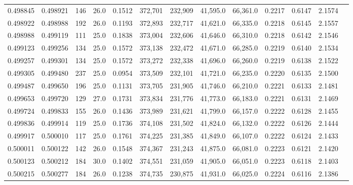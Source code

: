 \begin{tabular}{rrrrrrrrrrrrr}
0.498845 & 0.498921 &   146 & 26.0 &                                     0.1512 & 372,701 & 232,909 &  41,595.0 &  66,361.0 & 0.2217 & 0.6147 & 2.1574 \\
0.498922 & 0.498988 &   192 & 26.0 &                                     0.1193 & 372,893 & 232,717 &  41,621.0 &  66,335.0 & 0.2218 & 0.6145 & 2.1557 \\
0.498988 & 0.499119 &   111 & 25.0 &                                     0.1838 & 373,004 & 232,606 &  41,646.0 &  66,310.0 & 0.2218 & 0.6142 & 2.1546 \\
0.499123 & 0.499256 &   134 & 25.0 &                                     0.1572 & 373,138 & 232,472 &  41,671.0 &  66,285.0 & 0.2219 & 0.6140 & 2.1534 \\
0.499257 & 0.499301 &   134 & 25.0 &                                     0.1572 & 373,272 & 232,338 &  41,696.0 &  66,260.0 & 0.2219 & 0.6138 & 2.1522 \\
0.499305 & 0.499480 &   237 & 25.0 &                                     0.0954 & 373,509 & 232,101 &  41,721.0 &  66,235.0 & 0.2220 & 0.6135 & 2.1500 \\
0.499487 & 0.499650 &   196 & 25.0 &                                     0.1131 & 373,705 & 231,905 &  41,746.0 &  66,210.0 & 0.2221 & 0.6133 & 2.1481 \\
0.499653 & 0.499720 &   129 & 27.0 &                                     0.1731 & 373,834 & 231,776 &  41,773.0 &  66,183.0 & 0.2221 & 0.6131 & 2.1469 \\
0.499724 & 0.499833 &   155 & 26.0 &                                     0.1436 & 373,989 & 231,621 &  41,799.0 &  66,157.0 & 0.2222 & 0.6128 & 2.1455 \\
0.499836 & 0.499914 &   119 & 25.0 &                                     0.1736 & 374,108 & 231,502 &  41,824.0 &  66,132.0 & 0.2222 & 0.6126 & 2.1444 \\
0.499917 & 0.500010 &   117 & 25.0 &                                     0.1761 & 374,225 & 231,385 &  41,849.0 &  66,107.0 & 0.2222 & 0.6124 & 2.1433 \\
0.500011 & 0.500122 &   142 & 26.0 &                                     0.1548 & 374,367 & 231,243 &  41,875.0 &  66,081.0 & 0.2223 & 0.6121 & 2.1420 \\
0.500123 & 0.500212 &   184 & 30.0 &                                     0.1402 & 374,551 & 231,059 &  41,905.0 &  66,051.0 & 0.2223 & 0.6118 & 2.1403 \\
0.500215 & 0.500277 &   184 & 26.0 &                                     0.1238 & 374,735 & 230,875 &  41,931.0 &  66,025.0 & 0.2224 & 0.6116 & 2.1386 \\

\end{tabular}
